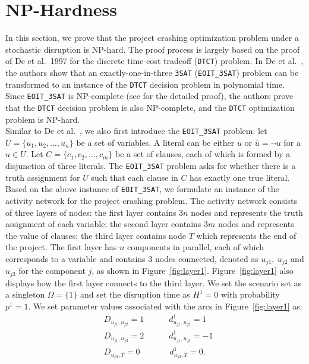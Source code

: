 \documentclass[11pt]{article}
\begin{document}
\section{NP-Hardness} \label{sec:nphard}
	In this section, we prove that the project crashing optimization problem under a stochastic disruption is NP-hard. The proof process is largely based on the proof of De et al.~1997 for the discrete time-cost tradeoff (\verb|DTCT|) problem. In De et al.~\cite{de1997complexity}, the authors show that an exactly-one-in-three \verb|3SAT| (\verb|EOIT_3SAT|) problem can be transformed to an instance of the \verb|DTCT| decision problem in polynomial time. Since \verb|EOIT_3SAT| is NP-complete (see \cite{Garey1979ComputersAI} for the detailed proof), the authors prove that the \verb|DTCT| decision problem is also NP-complete, and the \verb|DTCT| optimization problem is NP-hard.\\
	\newline
	Similar to De et al.~\cite{de1997complexity}, we also first introduce the \verb|EOIT_3SAT| problem: let \(U = \{u_1,u_2, \dots, u_n\}\) be a set of variables. A literal can be either \(u\) or \(\bar{u} = \neg u\) for a \(u \in U\). Let \(C = \{c_1, c_2, \dots, c_m\}\) be a set of clauses, each of which is formed by a disjunction of three literals. The \verb|EOIT_3SAT| problem asks for whether there is a truth assignment for \(U\) such that each clause in \(C\) has exactly one true literal. \\
	\newline
	Based on the above instance of \verb|EOIT_3SAT|, we formulate an instance of the activity network for the project crashing problem. The activity network consists of three layers of nodes: the first layer contains \(3n\) nodes and represents the truth assignment of each variable; the second layer contains \(3m\) nodes and represents the value of clauses; the third layer contains node \(T\) which represents the end of the project. The first layer has \(n\) components in parallel, each of which corresponds to a variable and contains 3 nodes connected, denoted as \(u_{j1},\ u_{j2}\) and \(u_{j3}\) for the component \(j\), as shown in Figure~\ref{fig:layer1}. Figure~\ref{fig:layer1} also displays how the first layer connects to the third layer. We set the scenario set as a singleton \(\Omega = \{1\}\) and set the disruption time as \(H^1 = 0\) with probability \(p^1 = 1\). We set parameter values associated with the arcs in Figure~\ref{fig:layer1} as:
	\begin{align*}
	& D_{u_{j1},u_{j2}} = 1 \qquad \quad d^1_{u_{j1},u_{j2}} = 1\\
	& D_{u_{j1},u_{j3}} = 2 \qquad \quad d^1_{u_{j1},u_{j3}} = -1  \\
	& D_{u_{j3},T} = 0 \qquad \quad \;\; d^1_{u_{j3},T} = 0.
	\end{align*}
\end{document}
